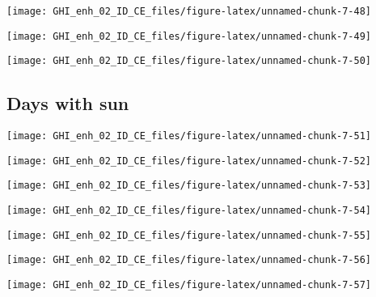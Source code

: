 \documentclass[
  10pt,
  a4paper,oneside]{article}
\begin{document}
\begin{center}\texttt{[image: GHI\_enh\_02\_ID\_CE\_files/figure-latex/unnamed-chunk-7-48]} \end{center}

\begin{center}\texttt{[image: GHI\_enh\_02\_ID\_CE\_files/figure-latex/unnamed-chunk-7-49]} \end{center}

\begin{center}\texttt{[image: GHI\_enh\_02\_ID\_CE\_files/figure-latex/unnamed-chunk-7-50]} \end{center}

\FloatBarrier

\hypertarget{days-with-sun}{%
\subsection{Days with sun}\label{days-with-sun}}

\begin{center}\texttt{[image: GHI\_enh\_02\_ID\_CE\_files/figure-latex/unnamed-chunk-7-51]} \end{center}

\begin{center}\texttt{[image: GHI\_enh\_02\_ID\_CE\_files/figure-latex/unnamed-chunk-7-52]} \end{center}

\begin{center}\texttt{[image: GHI\_enh\_02\_ID\_CE\_files/figure-latex/unnamed-chunk-7-53]} \end{center}

\begin{center}\texttt{[image: GHI\_enh\_02\_ID\_CE\_files/figure-latex/unnamed-chunk-7-54]} \end{center}

\begin{center}\texttt{[image: GHI\_enh\_02\_ID\_CE\_files/figure-latex/unnamed-chunk-7-55]} \end{center}

\begin{center}\texttt{[image: GHI\_enh\_02\_ID\_CE\_files/figure-latex/unnamed-chunk-7-56]} \end{center}

\begin{center}\texttt{[image: GHI\_enh\_02\_ID\_CE\_files/figure-latex/unnamed-chunk-7-57]} \end{center}
\end{document}
